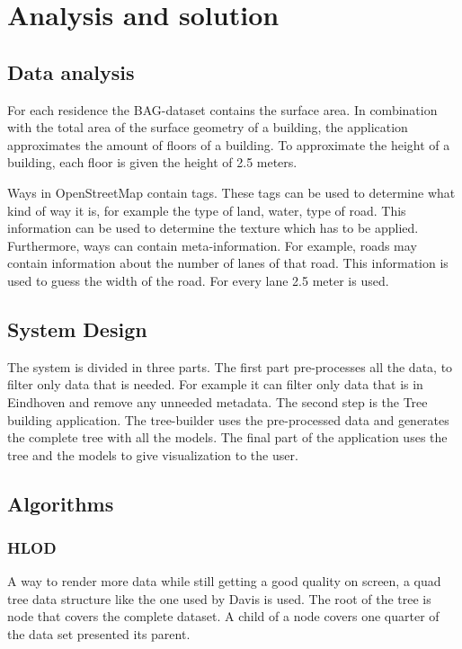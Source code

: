 \chapter{Analysis and solution}
\label{chap:AnalysisAndSolution}
\section{Data analysis}
\label{sec:DataAnalysis}
For each residence the BAG-dataset contains the surface area. In combination with the total area of the surface geometry of a building, the application approximates the amount of floors of a building. To approximate the height of a building, each floor is given the height of 2.5 meters.

Ways in OpenStreetMap contain tags. These tags can be used to determine what kind of way it is, for example the type of land, water, type of road. This information can be used to determine the texture which has to be applied. Furthermore, ways can contain meta-information.  For example, roads may contain information about the number of lanes of that road. This information is used to guess the width of the road. For every lane 2.5 meter is used.

\section{System Design}
\label{sec:SystemDesign}
The system is divided in three parts. The first part pre-processes all the data, to filter only data that is needed. For example it can filter only data that is in Eindhoven and remove any unneeded metadata. The second step is the Tree building application. The tree-builder uses the pre-processed data and generates the complete tree with all the models. The final part of the application uses the tree and the models to give visualization to the user.

\section{Algorithms}
\label{sec:Algorithms}
\subsection{HLOD}
\label{subsec:HLOD}
A way to render more data while still getting a good quality on screen, a quad tree data structure like the one used by Davis \cite{Davis} is used. The root of the tree is node that covers the complete dataset. A child of a node covers one quarter of the data set presented its parent.

